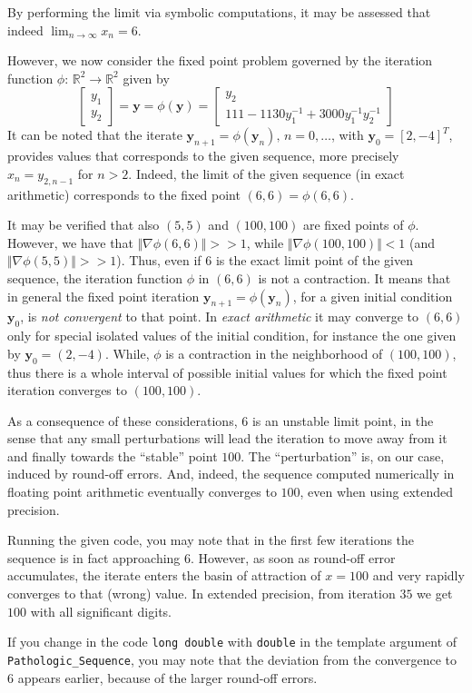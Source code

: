 \documentclass{article}
\begin{document}
    By performing the limit via symbolic computations, it may be
    assessed that indeed $\lim_{n\to\infty} x_n=6$.

    However, we now consider the fixed point problem governed by the
    iteration function $\phi:\,\mathbb{R}^2\to\mathbb{R}^2$ given by
    \[
      \begin{bmatrix}
        y_1\\y_2 \end{bmatrix}=\mathbf{y}=\phi(\mathbf{y})=\begin{bmatrix}
        y_2\\
        111-1130y^{-1}_1+3000y^{-1}_{1}y^{-1}_{2}
        \end{bmatrix}
    \]
    It can be noted that the iterate
    $\mathbf{y}_{n+1}=\phi(\mathbf{y}_{n}),\, n=0,\ldots$, with
    $\mathbf{y}_0=[2,-4]^T$, provides values that corresponds to the
    given sequence, more precisely $x_n=y_{2,n-1}$ for $n>2$. Indeed,
    the limit of the given sequence (in exact arithmetic) corresponds
    to the fixed point $(6,6)=\phi(6,6)$.
    
    It may be verified that also $(5,5)$ and $(100,100)$ are fixed
    points of $\phi$. However, we have that
    $\Vert\nabla\phi(6,6)\Vert>>1$, while
    $\Vert\nabla\phi(100,100)\Vert<1$ (and
    $\Vert\nabla\phi(5,5)\Vert>>1$). Thus, even if $6$ is the exact
    limit point of the given sequence, the iteration function $\phi$
    in $(6,6)$ is not a contraction. It means that in general the
    fixed point iteration $\mathbf{y}_{n+1}=\phi(\mathbf{y}_n)$, for a
    given initial condition $\mathbf{y}_0$, is \emph{not convergent} to that
    point.  In \emph{exact arithmetic} it may converge to $(6,6)$ only
    for special isolated values of the initial condition, for instance
    the one given by $\mathbf{y}_0=(2,-4)$.  While, $\phi$ is a
    contraction in the neighborhood of $(100,100)$, thus there is a
    whole interval of possible initial values for which the fixed
    point iteration converges to $(100,100)$.

    As a consequence of these considerations, $6$ is an unstable limit
    point, in the sense that any small perturbations will lead the
    iteration to move away from it and finally towards the ``stable''
    point $100$. The ``perturbation'' is, on our case, induced by
    round-off errors. And, indeed, the sequence computed numerically
    in floating point arithmetic eventually converges to $100$, even
    when using extended precision.

    Running the given code, you may note that in the first few
    iterations the sequence is in fact approaching $6$. However, as
    soon as round-off error accumulates, the iterate enters the basin
    of attraction of $x=100$ and very rapidly converges to that
    (wrong) value. In extended precision, from iteration $35$ we get
    $100$ with all significant digits.

    If you change in the code \texttt{long double} with
    \texttt{double} in the template argument of
    \texttt{Pathologic\_Sequence}, you may note that the deviation
    from the convergence to $6$ appears earlier, because of the larger
    round-off errors.
 
\end{document}
